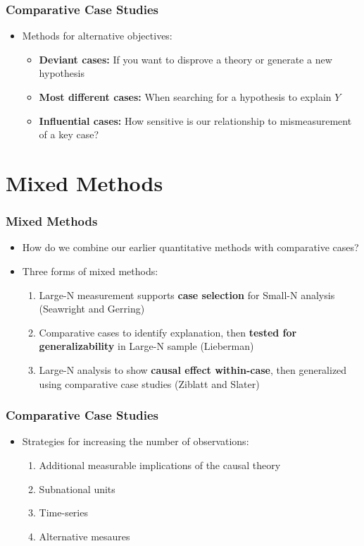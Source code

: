 \documentclass[xcolor=x11names,compress]{beamer}\usepackage[]{graphicx}\usepackage[]{color}
\renewcommand{\(}{\begin{columns}}
\renewcommand{\)}{\end{columns}}
\newcommand{\<}[1]{\begin{column}{#1}}
\renewcommand{\>}{\end{column}}
\begin{document}
\begin{frame}
\frametitle{Comparative Case Studies}
\begin{itemize}
\item Methods for alternative objectives:
\pause
\begin{itemize}
\item \textbf{Deviant cases:} If you want to disprove a theory or generate a new hypothesis
\pause
\item \textbf{Most different cases:} When searching for a hypothesis to explain $Y$
\pause
\item \textbf{Influential cases:} How sensitive is our relationship to mismeasurement of a key case?
\end{itemize}
\end{itemize}
\end{frame}

\section{Mixed Methods}

\begin{frame}
\frametitle{Mixed Methods}
\begin{itemize}
\item How do we combine our earlier quantitative methods with comparative cases?
\pause
\item Three forms of mixed methods:
\pause
\begin{enumerate}
\item Large-N measurement supports \textbf{case selection} for Small-N analysis (Seawright and Gerring)
\pause
\item Comparative cases to identify explanation, then \textbf{tested for generalizability} in Large-N sample (Lieberman)
\pause
\item Large-N analysis to show \textbf{causal effect within-case}, then generalized using comparative case studies (Ziblatt and Slater)
\end{enumerate}
\end{itemize}
\end{frame}

\begin{frame}
\frametitle{Comparative Case Studies}
\begin{itemize}
\item Strategies for increasing the number of observations:
\pause
\begin{enumerate}
\item Additional measurable implications of the causal theory
\pause
\item Subnational units
\pause
\item Time-series
\pause
\item Alternative mesaures
\end{enumerate}
\end{itemize}
\end{frame}
\end{document}
